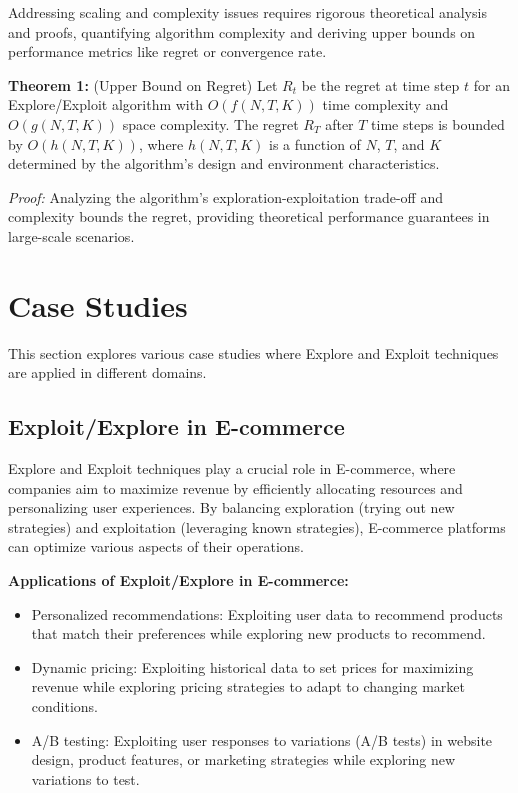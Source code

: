 \documentclass[12pt]{book} %
\begin{document}
Addressing scaling and complexity issues requires rigorous theoretical analysis and proofs, quantifying algorithm complexity and deriving upper bounds on performance metrics like regret or convergence rate.

\textbf{Theorem 1:} (Upper Bound on Regret) Let \(R_t\) be the regret at time step \(t\) for an Explore/Exploit algorithm with \(O(f(N, T, K))\) time complexity and \(O(g(N, T, K))\) space complexity. The regret \(R_T\) after \(T\) time steps is bounded by \(O(h(N, T, K))\), where \(h(N, T, K)\) is a function of \(N\), \(T\), and \(K\) determined by the algorithm's design and environment characteristics.

\textit{Proof:} Analyzing the algorithm's exploration-exploitation trade-off and complexity bounds the regret, providing theoretical performance guarantees in large-scale scenarios.


\section{Case Studies}
This section explores various case studies where Explore and Exploit techniques are applied in different domains.

\subsection{Exploit/Explore in E-commerce}
Explore and Exploit techniques play a crucial role in E-commerce, where companies aim to maximize revenue by efficiently allocating resources and personalizing user experiences. By balancing exploration (trying out new strategies) and exploitation (leveraging known strategies), E-commerce platforms can optimize various aspects of their operations.

\textbf{Applications of Exploit/Explore in E-commerce:}
\begin{itemize}
    \item Personalized recommendations: Exploiting user data to recommend products that match their preferences while exploring new products to recommend.
    \item Dynamic pricing: Exploiting historical data to set prices for maximizing revenue while exploring pricing strategies to adapt to changing market conditions.
    \item A/B testing: Exploiting user responses to variations (A/B tests) in website design, product features, or marketing strategies while exploring new variations to test.
\end{itemize}
\end{document}
